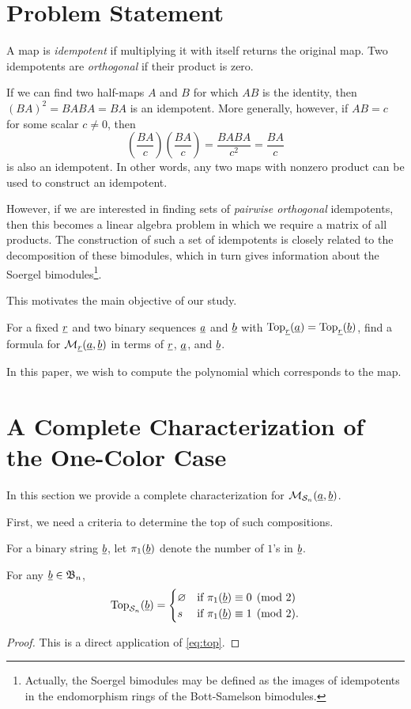 \section{Problem Statement}
\label{sec:probstate}
\begin{definition}
	A map is \emph{idempotent} if multiplying it with itself returns the original map.  Two idempotents are \emph{orthogonal} if their product is zero.
\end{definition}
If we can find two half-maps $A$ and $B$ for which $AB$ is the identity, then $(BA)^2=BABA=BA$ is an idempotent.  More generally, however, if $AB = c$ for some scalar $c \neq 0$, then \[ \left( \frac{BA}{c} \right)\left( \frac{BA}{c} \right) = \frac{BABA}{c^2} = \frac{BA}{c} \] is also an idempotent.  In other words, any two maps with nonzero product can be used to construct an idempotent.

However, if we are interested in finding sets of \emph{pairwise orthogonal} idempotents, then this becomes a linear algebra problem in which we require a matrix of all products.  The construction of such a set of idempotents is closely related to the decomposition of these bimodules, which in turn gives information about the Soergel bimodules\footnote{Actually, the Soergel bimodules may be defined as the images of idempotents in the endomorphism rings of the Bott-Samelson bimodules.}.

This motivates the main objective of our study.
\begin{ques*}
	For a fixed $\underline{r}$ and two binary sequences $\underline{a}$ and $\underline{b}$ with $\operatorname{Top}_{\underline{r}}(\underline{a}) = \operatorname{Top}_{\underline{r}}(\underline{b})$, find a formula for $\mathcal M_{\underline{r}}(\underline{a}, \underline{b})$ in terms of $\underline{r}$, $\underline{a}$, and $\underline{b}$.
\end{ques*}
In this paper, we wish to compute the polynomial which corresponds to the map.

\section{A Complete Characterization of the One-Color Case}
\label{sec:res_onecolor}
In this section we provide a complete characterization for $\mathcal M_{\mathcal S_n}(\underline{a}, \underline{b})$.  %

First, we need a criteria to determine the top of such compositions.
\begin{definition}
	For a binary string $\underline{b}$, let $\pi_1(\underline{b})$ denote the number of $1$'s in $\underline{b}$.
\end{definition}
\begin{proposition}
	For any $\underline{b} \in \mathfrak B_n$, \[
		\operatorname{Top}_{\mathcal S_n}(\underline{b}) =
		\begin{cases}
			\varnothing & \text{if } \pi_1(\underline{b}) \equiv 0 \pmod{2} \\
			s & \text{if } \pi_1(\underline{b}) \equiv 1 \pmod{2}.
		\end{cases}
		\]
	\label{prop:s_top}
\end{proposition}
\begin{proof}
	This is a direct application of \eqref{eq:top}.
\end{proof}

